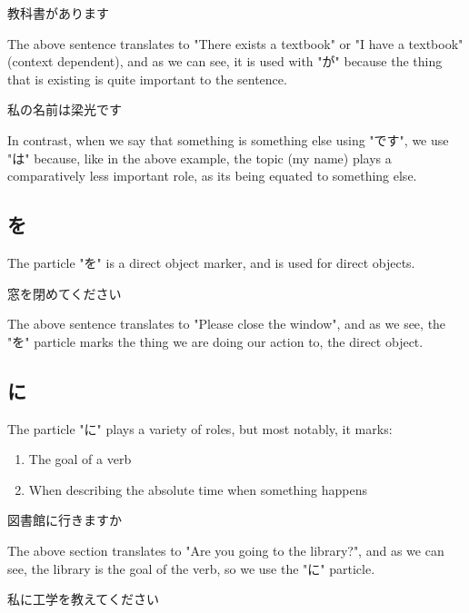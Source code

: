 \documentclass{article}
\begin{document}
\begin{CJK}{UTF8}{min}
\begin{example}
教科書があります
\end{example}

The above sentence translates to "There exists a textbook" or "I have a textbook" (context dependent), and as we can see, it is used with "が" because the thing that is existing is quite important to the sentence.

\begin{example}
私の名前は梁光です
\end{example}

In contrast, when we say that something is something else using "です", we use "は" because, like in the above example, the topic (my name) plays a comparatively less important role, as its being equated to something else.

\subsection{を}

The particle "を" is a direct object marker, and is used for direct objects.

\begin{example}
窓を閉めてください
\end{example}

The above sentence translates to "Please close the window", and as we see, the "を" particle marks the thing we are doing our action to, the direct object. 

\subsection{に}

The particle "に" plays a variety of roles, but most notably, it marks:

\begin{enumerate}
    \item The goal of a verb
    \item When describing the absolute time when something happens
\end{enumerate}

\begin{example}
図書館に行きますか
\end{example}

The above section translates to "Are you going to the library?", and as we can see, the library is the goal of the verb, so we use the "に" particle.

\begin{example}
私に工学を教えてください
\end{example}


\end{CJK}
\end{document}
